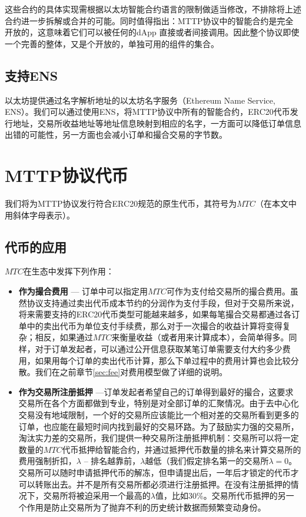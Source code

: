 \documentclass[UTF8,nofonts]{ctexart}
\begin{document}
这些合约的具体实现需根据以太坊智能合约语言的限制做适当修改，不排除将上述合约进一步拆解或合并的可能。同时值得指出：MTTP协议中的智能合约是完全开放的，这意味着它们可以被任何的dApp 直接或者间接调用。因此整个协议即使一个完善的整体，又是个开放的，单独可用的组件的集合。


\subsection{支持ENS\label{sec:registration}}

以太坊提供通过名字解析地址的以太坊名字服务（Ethereum Name Service, ENS）\cite{hirai2016formal}。我们可以通过使用ENS，将MTTP协议中所有的智能合约，ERC20代币发行地址，交易所收益地址等地址信息映射到相应的名字，一方面可以降低订单信息出错的可能性，另一方面也会减小订单和撮合交易的字节数。



\section{MTTP协议代币\label{sec:protocoltoken}}

我们将为MTTP协议发行符合ERC20规范的原生代币，其符号为$MTC$（在本文中用斜体字母表示）。


\subsection{代币的应用}

$MTC$在生态中发挥下列作用：

\begin{itemize}
	\item \textbf{作为撮合费用} --- 订单中可以指定用$MTC$可作为支付给交易所的撮合费用。虽然协议支持通过卖出代币成本节约的分润作为支付手段，但对于交易所来说，将来需要支持的ERC20代币类型可能越来越多，如果每笔撮合交易都通过各订单中的卖出代币为单位支付手续费，那么对于一次撮合的收益计算将变得复杂；相反，如果通过$MTC$来衡量收益（或者用来计算成本），会简单得多。同样，对于订单发起者，可以通过公开信息获取某笔订单需要支付大约多少费用，如果用每个订单的卖出代币计算，那么下单过程中的费用计算也会比较分散。我们在之前章节\ref{sec:fee}对费用模型做了详细的说明。
	\item \textbf{作为交易所注册抵押} ---订单发起者希望自己的订单得到最好的撮合，这要求交易所在各个方面都做到专业，特别是对全部订单的汇聚情况。由于去中心化交易没有地域限制，一个好的交易所应该能比一个相对差的交易所看到更多的订单，也应能在最短时间内找到最好的交易环路。为了鼓励实力强的交易所，淘汰实力差的交易所，我们提供一种交易所注册抵押机制：交易所可以将一定数量的$MTC$代币抵押给智能合约，并通过抵押代币数量的排名来计算交易所的费用强制折扣，$\lambda$ -- 排名越靠前，$\lambda$越低（我们假定排名第一的交易所$\lambda=0$。交易所可以随时申请抵押代币的解冻，但申请提出后，一年后才锁定的代币才可以转账出去。并不是所有交易所都必须进行注册抵押。在没有注册抵押的情况下，交易所将被迫采用一个最高的$\lambda$值，比如30\%。交易所代币抵押的另一个作用是防止交易所为了抛弃不利的历史统计数据而频繁变动身份。
\end{itemize}
\end{document}
